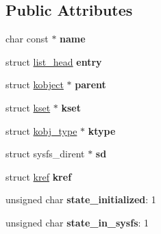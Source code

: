 \subsection*{Public Attributes}
\begin{DoxyCompactItemize}
\item 
\hypertarget{structkobject_ac5696741c574247d7e5d5f91101e47da}{}char const $\ast$ {\bfseries name}\label{structkobject_ac5696741c574247d7e5d5f91101e47da}

\item 
\hypertarget{structkobject_a65bcc880dab30f6ccb864000d7faf94e}{}struct \hyperlink{structlist__head}{list\+\_\+head} {\bfseries entry}\label{structkobject_a65bcc880dab30f6ccb864000d7faf94e}

\item 
\hypertarget{structkobject_aa5600127f77e9d21a31b79d3d69fd448}{}struct \hyperlink{structkobject}{kobject} $\ast$ {\bfseries parent}\label{structkobject_aa5600127f77e9d21a31b79d3d69fd448}

\item 
\hypertarget{structkobject_a460e91b6ed488e4d8b7f91bbbf27ab0e}{}struct \hyperlink{structkset}{kset} $\ast$ {\bfseries kset}\label{structkobject_a460e91b6ed488e4d8b7f91bbbf27ab0e}

\item 
\hypertarget{structkobject_aa1f6f3437cbdfdc99bd755683ece3f73}{}struct \hyperlink{structkobj__type}{kobj\+\_\+type} $\ast$ {\bfseries ktype}\label{structkobject_aa1f6f3437cbdfdc99bd755683ece3f73}

\item 
\hypertarget{structkobject_ae2755129ec5e1e62bdd58019153bacf9}{}struct sysfs\+\_\+dirent $\ast$ {\bfseries sd}\label{structkobject_ae2755129ec5e1e62bdd58019153bacf9}

\item 
\hypertarget{structkobject_a0d3071132d4a7323d7a173722f1b55d8}{}struct \hyperlink{structkref}{kref} {\bfseries kref}\label{structkobject_a0d3071132d4a7323d7a173722f1b55d8}

\item 
\hypertarget{structkobject_a7de84950992dc0b3198a8689d9bed73c}{}unsigned char {\bfseries state\+\_\+initialized}\+: 1\label{structkobject_a7de84950992dc0b3198a8689d9bed73c}

\item 
\hypertarget{structkobject_a54db2998f5d493dac8cef9741133371e}{}unsigned char {\bfseries state\+\_\+in\+\_\+sysfs}\+: 1\label{structkobject_a54db2998f5d493dac8cef9741133371e}


\end{DoxyCompactItemize}
